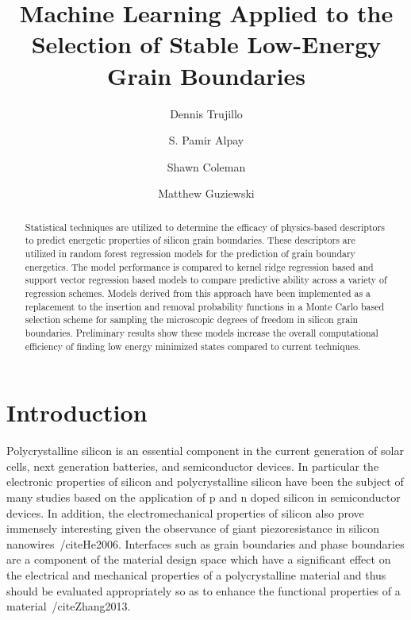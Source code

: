 \documentclass[aip,reprint,longbibliography,amsmath,amssymb,twocolumn,superscriptaddress]{revtex4-1}
\begin{document}
\title{Machine Learning Applied to the Selection of Stable Low-Energy Grain Boundaries}
\author{Dennis Trujillo}
\author{S. Pamir Alpay}
\author{Shawn Coleman}
\author{Matthew Guziewski}



\begin{abstract}
Statistical techniques are utilized to determine the efficacy of physics-based descriptors to predict energetic properties of silicon grain boundaries. 
%
These descriptors are utilized in random forest regression models for the prediction of grain boundary energetics. 
%
The model performance is compared to kernel ridge regression based and support vector regression based models to compare predictive ability across a variety of regression schemes. 
%
Models derived from this approach have been implemented as a replacement to the insertion and removal probability functions in a Monte Carlo based selection scheme for sampling the microscopic degrees of freedom in silicon grain boundaries.  
%
Preliminary results show these models increase the overall computational efficiency of finding low energy minimized states compared to current techniques. 
\end{abstract}

\maketitle 

\section{Introduction}
Polycrystalline silicon is an essential component in the current generation of solar cells, next generation batteries, and semiconductor devices. 
%
In particular the electronic properties of silicon and polycrystalline silicon have been the subject of many studies based on the application of p and n doped silicon in semiconductor devices.
%
In addition, the electromechanical properties of silicon also prove immensely interesting given the observance of giant piezoresistance in silicon nanowires~/cite{He2006}. 
%
Interfaces such as grain boundaries and phase boundaries are a component of the material design space which have a significant effect on the electrical and mechanical properties of a polycrystalline material and thus should be evaluated appropriately so as to enhance the functional properties of a material~/cite{Zhang2013}. 
\end{document}
